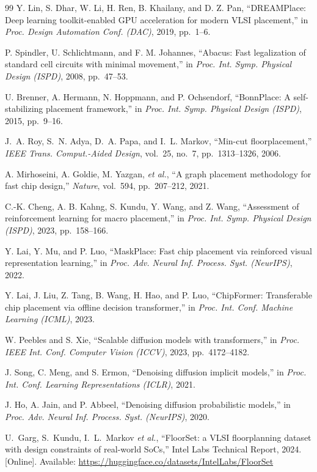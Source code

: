 \documentclass[nolineno]{ieeeaccess}
\begin{document}
\begin{thebibliography}{99}
Y. Lin, S. Dhar, W. Li, H. Ren, B. Khailany, and D. Z. Pan,
``DREAMPlace: Deep learning toolkit-enabled GPU acceleration for modern VLSI placement,''
in \emph{Proc. Design Automation Conf. (DAC)}, 2019, pp.~1--6.

P. Spindler, U. Schlichtmann, and F. M. Johannes,
``Abacus: Fast legalization of standard cell circuits with minimal movement,''
in \emph{Proc. Int. Symp. Physical Design (ISPD)}, 2008, pp.~47--53.

U. Brenner, A. Hermann, N. Hoppmann, and P. Ochsendorf,
``BonnPlace: A self-stabilizing placement framework,''
in \emph{Proc. Int. Symp. Physical Design (ISPD)}, 2015, pp.~9--16.

J.~A. Roy, S.~N. Adya, D.~A. Papa, and I.~L. Markov,
``Min-cut floorplacement,''
\emph{IEEE Trans. Comput.-Aided Design}, vol.~25, no.~7, pp.~1313--1326, 2006.

A. Mirhoseini, A. Goldie, M. Yazgan, \emph{et al.},
``A graph placement methodology for fast chip design,''
\emph{Nature}, vol.~594, pp.~207--212, 2021.

C.-K. Cheng, A. B. Kahng, S. Kundu, Y. Wang, and Z. Wang,
``Assessment of reinforcement learning for macro placement,''
in \emph{Proc. Int. Symp. Physical Design (ISPD)}, 2023, pp.~158--166.

Y. Lai, Y. Mu, and P. Luo,
``MaskPlace: Fast chip placement via reinforced visual representation learning,''
in \emph{Proc. Adv. Neural Inf. Process. Syst. (NeurIPS)}, 2022.

Y. Lai, J. Liu, Z. Tang, B. Wang, H. Hao, and P. Luo,
``ChipFormer: Transferable chip placement via offline decision transformer,''
in \emph{Proc. Int. Conf. Machine Learning (ICML)}, 2023.

W. Peebles and S. Xie,
``Scalable diffusion models with transformers,''
in \emph{Proc. IEEE Int. Conf. Computer Vision (ICCV)}, 2023, pp.~4172--4182.

J. Song, C. Meng, and S. Ermon,
``Denoising diffusion implicit models,''
in \emph{Proc. Int. Conf. Learning Representations (ICLR)}, 2021.

J. Ho, A. Jain, and P. Abbeel,
``Denoising diffusion probabilistic models,''
in \emph{Proc. Adv. Neural Inf. Process. Syst. (NeurIPS)}, 2020.

U.~Garg, S.~Kundu, I.~L.~Markov \emph{et al.},
``FloorSet: a VLSI floorplanning dataset with design constraints of
real-world SoCs,''
Intel Labs Technical Report, 2024. [Online]. Available:
\url{https://huggingface.co/datasets/IntelLabs/FloorSet}

\end{thebibliography}
\end{document}
